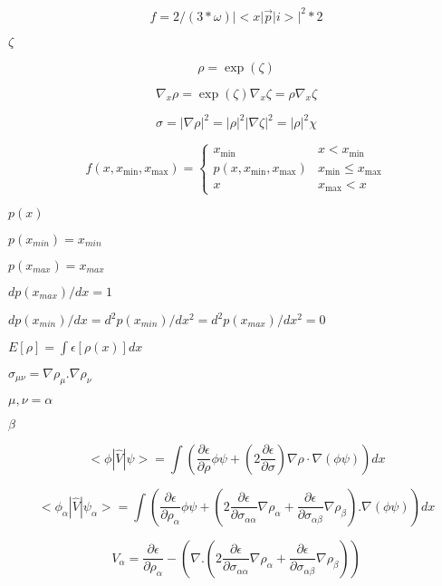 \documentclass{article}
\begin{document}
\[
f = 2/(3 * \omega) |<x | \vec p | i >| ^2 * 2
\]
\pagebreak

$ \zeta $
\pagebreak

\[
\rho = \exp(\zeta)
\]
\pagebreak

\[
\nabla_x\rho = \exp(\zeta)\nabla_x\zeta = \rho \nabla_x\zeta
\]
\pagebreak

\[
  \sigma = |\nabla\rho|^2 = |\rho|^2 |\nabla\zeta|^2 = |\rho|^2 \chi
\]
\pagebreak

\[
f(x,x_{\mathrm{min}},x_{\mathrm{max}}) = \left\{
  \begin{array}{ll}
    x_{\mathrm{min}}                       & x < x_{\mathrm{min}} \\
    p(x,x_{\mathrm{min}},x_{\mathrm{max}}) & x_{\mathrm{min}} \leq x_{\mathrm{max}} \\
    x                                      & x_{\mathrm{max}} < x
  \end{array}
\right.
\]
\pagebreak

$p(x)$
\pagebreak

$p(x_{min})=x_{min}$
\pagebreak

$p(x_{max})=x_{max}$
\pagebreak

$dp(x_{max})/dx=1$
\pagebreak

$dp(x_{min})/dx=d^2p(x_{min})/dx^2=d^2p(x_{max})/dx^2=0$
\pagebreak

$ E[\rho] = \int \epsilon[\rho(x)] dx$
\pagebreak

$ \sigma_{\mu \nu} = \nabla \rho_{\mu} . \nabla \rho_{\nu} $
\pagebreak

$ \mu, \nu = \alpha$
\pagebreak

$ \beta $
\pagebreak

\[
  < \phi | \hat V | \psi > = \int \left( \frac{\partial \epsilon}{\partial \rho} \phi \psi
                 +  \left( 2 \frac{\partial \epsilon}{\partial \sigma} \right)
                 \nabla \rho \cdot \nabla \left( \phi \psi \right) \right) dx
\]
\pagebreak

\[
  < \phi_{\alpha} | \hat V | \psi_{\alpha} > = \int \left( \frac{\partial \epsilon}{\partial \rho_{\alpha}} \phi \psi
           +  \left( 2 \frac{\partial \epsilon}{\partial \sigma_{\alpha \alpha}} \nabla \rho_{\alpha}
           + \frac{\partial \epsilon}{\partial \sigma_{\alpha \beta}} \nabla \rho_{\beta}  \right) . \nabla \left( \phi \psi \right) \right) dx
\]
\pagebreak

\[
   V_{\alpha} =  \frac{\partial \epsilon}{\partial \rho_{\alpha}}
                 - \left(\nabla . \left(2 \frac{\partial \epsilon}{\partial \sigma_{\alpha \alpha}} \nabla \rho_{\alpha}
                 + \frac{\partial \epsilon}{\partial \sigma_{\alpha \beta}} \nabla \rho_{\beta}  \right)  \right)
\]
\pagebreak
\end{document}
